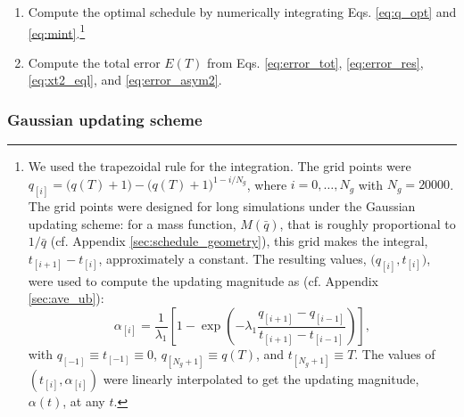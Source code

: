 \documentclass[preprint, superscriptaddress, floatfix]{revtex4-1}
\newcommand{\Err}{E}
\begin{document}
\begin{enumerate}
\item \label{step:alpha}
Compute the optimal schedule by
numerically integrating
Eqs. \eqref{eq:q_opt} and \eqref{eq:mint}.\footnote{We
  used the trapezoidal rule for the integration.
  The grid points were
  $q_{[i]} = \bigl(q(T) + 1\bigr) - \bigl(q(T)+1\bigr)^{1-i/N_g}$,
  where $i = 0, \dots, N_g$
  with $N_g = 20000$.
  The grid points were designed for long simulations
  under the Gaussian updating scheme:
  for a mass function, $M(\bar q)$,
  that is roughly proportional to $1/\bar q$
  (cf. Appendix \ref{sec:schedule_geometry}),
  this grid makes the integral,
  $t_{[i+1]} - t_{[i]}$,
  approximately a constant.
  The resulting values, $\bigl(q_{[i]}, t_{[i]} \bigr)$,
  were used to compute the updating magnitude
  as (cf. Appendix \ref{sec:ave_ub}):
  $$%
    \alpha_{[i]}
    =
    \frac{1}{\lambda_1}
    \left[
      1
      -
      \exp\left(
      -\lambda_1
      \frac{ q_{[i+1]} - q_{[i-1]} }
           { t_{[i+1]} - t_{[i-1]} }
      \right)
    \right]
    ,
  $$%
  with
  $q_{[ -1]} \equiv t_{[-1]} \equiv 0$,
  $q_{[N_g+1]} \equiv q(T)$,
  and
  $t_{[N_g+1]} \equiv T$.
  The values of $(t_{[i]}, \alpha_{[i]})$
  were linearly interpolated
  to get the updating magnitude, $\alpha(t)$, at any $t$.
  }
%


\item
Compute the total error $\Err(T)$ from
Eqs.
\eqref{eq:error_tot},
\eqref{eq:error_res},
\eqref{eq:xt2_eql},
and
\eqref{eq:error_asym2}.

\end{enumerate}

%



\subsubsection{\label{sec:Gaussian_scheme}
Gaussian updating scheme}
\end{document}
